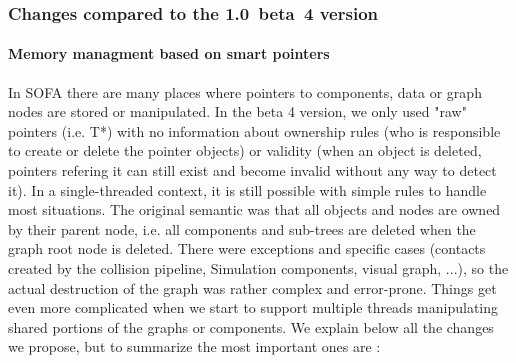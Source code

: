 \subsubsection{Changes compared to the 1.0~beta~4 version}\label{sec:design-core-objectmodel-changes}

\paragraph{Memory managment based on smart pointers}

In SOFA there are many places where pointers to components, data or graph nodes are stored or manipulated.
In the beta 4 version, we only used "raw" pointers (i.e. T*) with no information about ownership rules (who is responsible to create or delete the pointer objects) or validity (when an object is deleted, pointers refering it can still exist and become invalid without any way to detect it).
In a single-threaded context, it is still possible with simple rules to handle most situations.
The original semantic was that all objects and nodes are owned by their parent node, i.e. all components and sub-trees are deleted when the graph root node is deleted.
There were exceptions and specific cases (contacts created by the collision pipeline, Simulation components, visual graph, ...), so the actual destruction of the graph was rather complex and error-prone.
Things get even more complicated when we start to support multiple threads manipulating shared portions of the graphs or components.
We explain below all the changes we propose, but to summarize the most important ones are :
